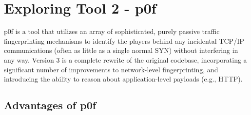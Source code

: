\documentclass[11pt]{article}
\begin{document}
\section{Exploring Tool 2 - p0f}
p0f is a tool that utilizes an array of sophisticated, purely passive traffic fingerprinting mechanisms to identify the players behind any incidental TCP/IP communications (often as little as a single normal SYN) without interfering in any way. Version 3 is a complete rewrite of the original codebase, incorporating a significant number of improvements to network-level fingerprinting, and introducing the ability to reason about application-level payloads (e.g., HTTP).


\subsection{Advantages of p0f}
\end{document}
